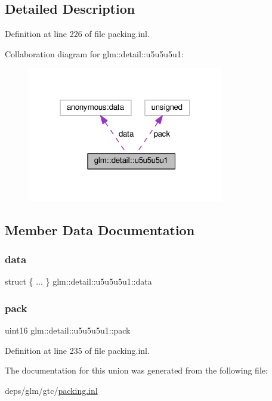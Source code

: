\subsection{Detailed Description}


Definition at line 226 of file packing.\+inl.



Collaboration diagram for glm\+:\+:detail\+:\+:u5u5u5u1\+:
\nopagebreak
\begin{figure}[H]
\begin{center}
\leavevmode
\includegraphics[width=243pt]{d2/d50/unionglm_1_1detail_1_1u5u5u5u1__coll__graph}
\end{center}
\end{figure}


\subsection{Member Data Documentation}
\mbox{\label{unionglm_1_1detail_1_1u5u5u5u1_a900aa35cb1048e63ac8aebb5ca69d0a5}} 
\subsubsection{\texorpdfstring{data}{data}}
{\footnotesize\ttfamily struct \{ ... \}   glm\+::detail\+::u5u5u5u1\+::data}

\mbox{\label{unionglm_1_1detail_1_1u5u5u5u1_acbc99680c58046aeb5c4f2b284680a8b}} 
\subsubsection{\texorpdfstring{pack}{pack}}
{\footnotesize\ttfamily uint16 glm\+::detail\+::u5u5u5u1\+::pack}



Definition at line 235 of file packing.\+inl.



The documentation for this union was generated from the following file\+:\begin{DoxyCompactItemize}
\item 
deps/glm/gtc/\hyperlink{packing_8inl}{packing.\+inl}\end{DoxyCompactItemize}
